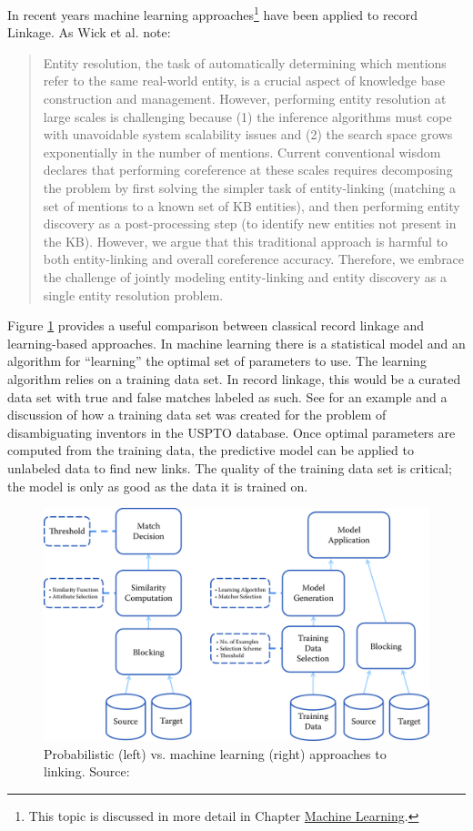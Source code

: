 \documentclass[]{krantz}
\begin{document}
In recent years machine learning approaches\footnote{This topic is
  discussed in more detail in Chapter
  \protect\hyperlink{chap:ml}{Machine Learning}.} have been applied to
record Linkage. As Wick et al. \citeyearpar{wick2013joint} note:

\begin{quote}
Entity resolution, the task of automatically determining which mentions
refer to the same real-world entity, is a crucial aspect of knowledge
base construction and management. However, performing entity resolution
at large scales is challenging because (1) the inference algorithms must
cope with unavoidable system scalability issues and (2) the search space
grows exponentially in the number of mentions. Current conventional
wisdom declares that performing coreference at these scales requires
decomposing the problem by first solving the simpler task of
entity-linking (matching a set of mentions to a known set of KB
entities), and then performing entity discovery as a post-processing
step (to identify new entities not present in the KB). However, we argue
that this traditional approach is harmful to both entity-linking and
overall coreference accuracy. Therefore, we embrace the challenge of
jointly modeling entity-linking and entity discovery as a single entity
resolution problem.
\end{quote}

Figure \ref{fig:fig3-2} provides a useful comparison between classical
record linkage and learning-based approaches. In machine learning there
is a statistical model and an algorithm for ``learning'' the optimal set
of parameters to use. The learning algorithm relies on a training data
set. In record linkage, this would be a curated data set with true and
false matches labeled as such. See \citep{ventura2015seeing} for an
example and a discussion of how a training data set was created for the
problem of disambiguating inventors in the USPTO database. Once optimal
parameters are computed from the training data, the predictive model can
be applied to unlabeled data to find new links. The quality of the
training data set is critical; the model is only as good as the data it
is trained on.

\begin{figure}

{\centering \includegraphics[width=0.7\linewidth]{ChapterLinkage/figures/fig3-2} 

}

\caption{Probabilistic (left) vs. machine learning (right) approaches to linking. Source: \cite{kopcke2010evaluation}}\label{fig:fig3-2}
\end{figure}
\end{document}
